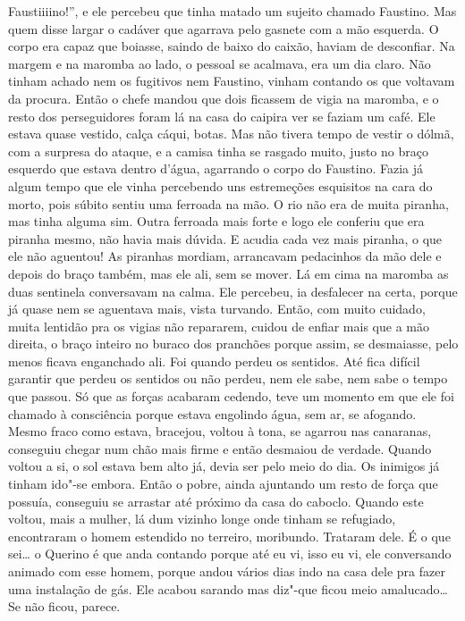 Faustiiiino!'', e ele percebeu que tinha matado um sujeito chamado
Faustino. Mas quem disse largar o cadáver que agarrava pelo gasnete com
a mão esquerda. O corpo era capaz que boiasse, saindo de baixo do
caixão, haviam de desconfiar. Na margem e na maromba ao lado, o pessoal
se acalmava, era um dia claro. Não tinham achado nem os fugitivos nem
Faustino, vinham contando os que voltavam da procura. Então o chefe
mandou que dois ficassem de vigia na maromba, e o resto dos
perseguidores foram lá na casa do caipira ver se faziam um café. Ele
estava quase vestido, calça cáqui, botas. Mas não tivera tempo de vestir
o dólmã, com a surpresa do ataque, e a camisa tinha se rasgado muito,
justo no braço esquerdo que estava dentro d'água, agarrando o corpo do
Faustino. Fazia já algum tempo que ele vinha percebendo uns estremeções
esquisitos na cara do morto, pois súbito sentiu uma ferroada na mão. O
rio não era de muita piranha, mas tinha alguma sim. Outra ferroada mais
forte e logo ele conferiu que era piranha mesmo, não havia mais dúvida.
E acudia cada vez mais piranha, o que ele não aguentou! As piranhas
mordiam, arrancavam pedacinhos da mão dele e depois do braço também, mas
ele ali, sem se mover. Lá em cima na maromba as duas sentinela
conversavam na calma. Ele percebeu, ia desfalecer na certa, porque já
quase nem se aguentava mais, vista turvando. Então, com muito cuidado,
muita lentidão pra os vigias não repararem, cuidou de enfiar mais que a
mão direita, o braço inteiro no buraco dos pranchões porque assim, se
desmaiasse, pelo menos ficava enganchado ali. Foi quando perdeu os
sentidos. Até fica difícil garantir que perdeu os sentidos ou não
perdeu, nem ele sabe, nem sabe o tempo que passou. Só que as forças
acabaram cedendo, teve um momento em que ele foi chamado à consciência
porque estava engolindo água, sem ar, se afogando. Mesmo fraco como
estava, bracejou, voltou à tona, se agarrou nas canaranas, conseguiu
chegar num chão mais firme e então desmaiou de verdade. Quando voltou a
si, o sol estava bem alto já, devia ser pelo meio do dia. Os inimigos já
tinham ido"-se embora. Então o pobre, ainda ajuntando um resto de força
que possuía, conseguiu se arrastar até próximo da casa do caboclo.
Quando este voltou, mais a mulher, lá dum vizinho longe onde tinham se
refugiado, encontraram o homem estendido no terreiro, moribundo.
Trataram dele. É o que sei\ldots{} o Querino é que anda contando porque até
eu vi, isso eu vi, ele conversando animado com esse homem, porque andou
vários dias indo na casa dele pra fazer uma instalação de gás. Ele
acabou sarando mas diz"-que ficou meio amalucado\ldots{} Se não ficou, parece.

